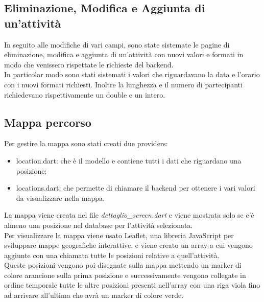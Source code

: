 \subsection{Eliminazione, Modifica e Aggiunta di un'attività}
In seguito alle modifiche di vari campi, sono state sistemate le pagine di eliminazione, modifica e aggiunta di un'attività con nuovi valori e formati in modo che venissero rispettate le richieste del backend.\\
In particolar modo sono stati sistemati i valori che riguardavano la data e l'orario con i nuovi formati richiesti. Inoltre la lunghezza e il numero di partecipanti richiedevano rispettivamente un double e un intero.

\newpage

\subsection{Mappa percorso}
Per gestire la mappa sono stati creati due providers:
\begin{itemize}
	\item location.dart: che è il modello e contiene tutti i dati che riguardano una posizione;
	\item locations.dart: che permette di chiamare il backend per ottenere i vari valori da visualizzare nella mappa.
\end{itemize}
La mappa viene creata nel file \textit{dettaglio\_screen.dart} e viene mostrata solo se c'è almeno una posizione nel database per l'attività selezionata.\\
Per visualizzare la mappa viene usato Leaflet, una libreria JavaScript per sviluppare mappe geografiche interattive, e viene creato un array a cui vengono aggiunte con una chiamata tutte le posizioni relative a quell'attività.\\ 
Queste posizioni vengono poi disegnate sulla mappa mettendo un marker di colore arancione sulla prima posizione e successivamente vengono collegate in ordine temporale tutte le altre posizioni presenti nell'array con una riga viola fino ad arrivare all'ultima che avrà un marker di colore verde.\\

